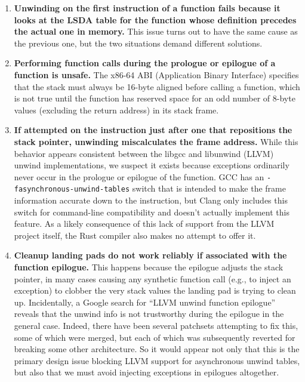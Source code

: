 \begin{enumerate}
\item \textbf{Unwinding on the first instruction of a function fails because it looks
at the LSDA table for the function whose definition precedes the actual one in
memory.}  This issue turns out to have the same cause as the previous one, but the
two situations demand different solutions.

\item \textbf{Performing function calls during the prologue or epilogue of a function
is unsafe.}  The x86-64 ABI (Application Binary Interface) specifies that the stack
must always be 16-byte aligned before calling a function, which is not true until the
function has reserved space for an odd number of 8-byte values (excluding the return
address) in its stack frame.

\item \textbf{If attempted on the instruction just after one that repositions the
stack pointer, unwinding miscalculates the frame address.}  While this behavior
appears consistent between the libgcc and libunwind (LLVM) unwind implementations, we
suspect it exists because exceptions ordinarily never occur in the prologue or
epilogue of the function.  GCC has an \texttt{-fasynchronous-unwind-tables} switch
that is intended to make the frame information accurate down to the instruction, but
Clang only includes this switch for command-line compatibility and doesn't actually
implement this feature.  As a likely consequence of this lack of support from the
LLVM project itself, the Rust compiler also makes no attempt to offer it.

\item \textbf{Cleanup landing pads do not work reliably if associated with the
function epilogue.}  This happens because the epilogue adjusts the stack pointer,
in many cases causing any synthetic function call (e.g., to inject an exception) to
clobber the very stack values the landing pad is trying to clean up.  Incidentally,
a Google search for ``LLVM unwind function epilogue'' reveals that the unwind info is
not trustworthy during the epilogue in the general case.  Indeed, there have been
several patchsets attempting to fix this, some of which were merged, but each of
which was subsequently reverted for breaking some other architecture.  So it would
appear not only that this is the primary design issue blocking LLVM support for
asynchronous unwind tables, but also that we must avoid injecting exceptions in
epilogues altogether.

\end{enumerate}

